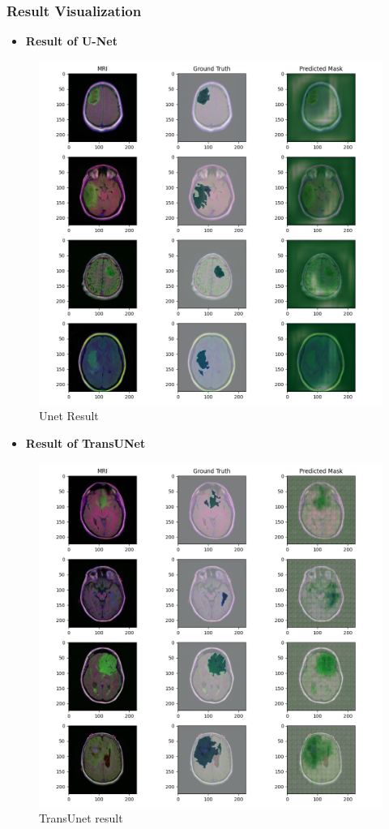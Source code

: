 \documentclass[11pt,a4paper]{article}
\begin{document}
\subsubsection{Result Visualization}
\begin{itemize}
    \item \textbf{Result of U-Net}
\end{itemize}
\begin{figure}[H]
    \centering
    \includegraphics[width= 0.9\linewidth]{Unet.png}
    \caption{Unet Result}
\end{figure}
\pagebreak
\begin{itemize}
    \item \textbf{Result of TransUNet}
\end{itemize}
\begin{figure}[H]
    \centering
    \includegraphics[width= 0.9\linewidth]{TransUnet.png}
    \caption{TransUnet result}
\end{figure}
\end{document}
